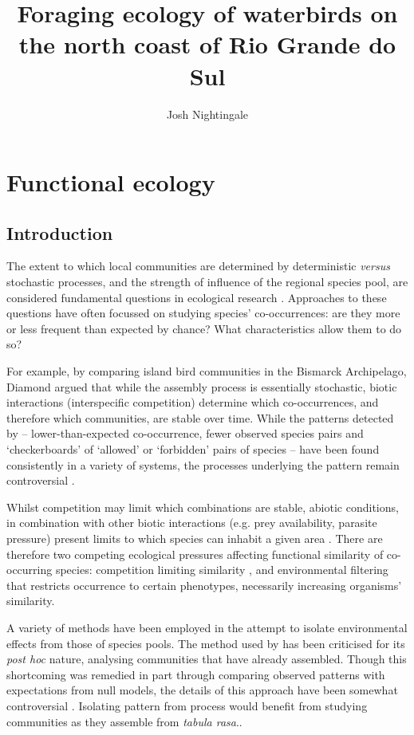 \documentclass[12pt,a4paper]{book}
\author{Josh Nightingale}
\title{Foraging ecology of waterbirds on the north coast of Rio Grande do Sul}
\begin{document}
\maketitle

\tableofcontents

\chapter{Functional ecology}

\section{Introduction}

The extent to which local communities are determined by deterministic \textit{versus} stochastic processes, and the strength of influence of the regional species pool, are considered fundamental questions in ecological research \citep{Sutherland2013}. Approaches to these questions have often focussed on studying species' co-occurrences: are they more or less frequent than expected by chance? What characteristics allow them to do so? 

For example, by comparing island bird communities in the Bismarck Archipelago, Diamond \citep[1975, in][]{Gotelli2002} argued that while the assembly process is essentially stochastic, biotic interactions (interspecific competition) determine which co-occurrences, and therefore which communities, are stable over time. While the patterns detected by \citet{Diamond1975} -- lower-than-expected co-occurrence, fewer observed species pairs and `checkerboards' of `allowed' or `forbidden' pairs of species -- have been found consistently in a variety of systems, the processes underlying the pattern remain controversial \citep{Gotelli2002}.

Whilst competition may limit which combinations are stable, abiotic conditions, in combination with other biotic interactions (e.g. prey availability, parasite pressure) present limits to which species can inhabit a given area \citep[e.g.][]{VanRiperIII1986, Mims2013}. There are therefore two competing ecological pressures affecting functional similarity of co-occurring species: competition limiting similarity \citep{Macarthur1967}, and environmental filtering that restricts occurrence to certain phenotypes, necessarily increasing organisms' similarity. 

A variety of methods have been employed in the attempt to isolate environmental effects from those of species pools. The method used by \citet{Diamond1975} has been criticised for its \textit{post hoc} nature, analysing communities that have already assembled. Though this shortcoming was remedied in part through comparing observed patterns with expectations from null models, the details of this approach have been somewhat controversial \citep{Gotelli2000}. Isolating pattern from process would benefit from studying communities as they assemble from \textit{tabula rasa}..
\end{document}
